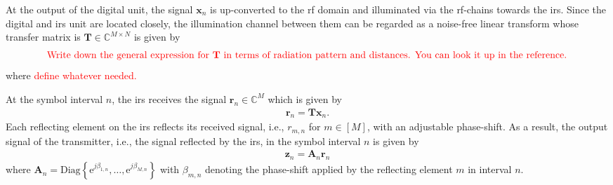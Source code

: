 \documentclass[12pt,draftclsnofoot,onecolumn,journal]{IEEEtran}
\newcommand{\cmt}[1]{\textcolor{red}{#1} }
\newcommand{\dbc}[1]{ \left[ #1 \right] }
\newcommand{\Diag}[1]{ \mathrm{Diag}\left\lbrace #1 \right\rbrace }
\newcommand{\e}{\mathrm{e}}
\begin{document}
At the output of the digital unit, the signal $\mathbf{x}_n$ is up-converted to the \ac{rf} domain and illuminated via the \ac{rf}-chains towards the \ac{irs}. Since the digital and \ac{irs} unit are located closely, the illumination channel between them can be regarded as a noise-free linear transform whose transfer matrix is  $\mathbf T\in\mathbb C^{M\times N}$ is given by \cite{jamali2020intelligent}
\begin{align}
\text{	\cmt{Write down the general expression for $\mathbf{T}$ in terms of radiation pattern and distances. You can look it up in the reference.}
}
\end{align}
where \cmt{define whatever needed.} 

At the symbol interval $n$, the \ac{irs} receives the signal $\mathbf{r}_n \in \mathbb C^{M}$ which is given by
\begin{align}
	\mathbf{r}_n = \mathbf{T} \mathbf{x}_n.
\end{align}
Each reflecting element on the  \ac{irs} reflects its received signal, i.e., $r_{m,n}$ for $m\in \dbc{M}$, with an adjustable phase-shift. As a result, the output signal of the transmitter, i.e., the signal reflected by the \ac{irs}, in the symbol interval $n$ is given by
\begin{align}
	\mathbf{z}_n = \mathbf{A}_n \mathbf{r}_n
\end{align}
where $\mathbf{A}_n = \Diag{ \e^{j\beta_{1,n}} , \ldots, \e^{j\beta_{M,n}} }$ with $\beta_{m,n}$ denoting the phase-shift applied by the reflecting element $m$ in interval $n$.
\end{document}
